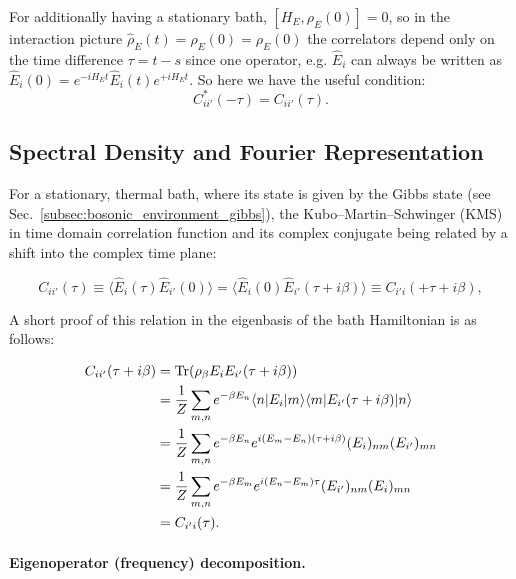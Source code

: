 \noindent
For additionally having a stationary bath, $[H_E, \rho_E(0)]=0$, so in the interaction picture $\hat{\rho}_E(t)=\hat{\rho}_E(0)=\rho_E(0)$ the correlators depend only on the time difference $\tau= t - s$ since one operator, e.g. $\hat{E}_{i}$ can always be written as $\hat{E}_{i}(0) = e^{-i H_E t} \hat{E}_i(t) e^{+i H_E t}$. So here we have the useful condition:
\begin{equation}
	C^{*}_{ii'}(-\tau) = C_{ii'}(\tau).
\end{equation}


\subsection{Spectral Density and Fourier Representation}
\label{subsec:spectral_density_representation}

\noindent
For a stationary, thermal bath, where its state is given by the Gibbs state (see Sec.~\ref{subsec:bosonic_environment_gibbs}), the Kubo--Martin--Schwinger (KMS) in time domain  correlation function and its complex conjugate being related by a shift into the complex time plane:

\begin{equation}
	C_{ii'}(\tau) \equiv \langle \hat{E}_{i}(\tau) \hat{E}_{i'}(0) \rangle  =  \langle \hat{E}_{i}(0) \hat{E}_{i'}(\tau + i \beta) \rangle  \equiv C_{i'i}(+\tau + i \beta),
	\label{eq:kms_time_relation}
\end{equation}

\noindent
A short proof of this relation in the eigenbasis of the bath Hamiltonian is as follows:

\begin{align}
	C_{ii'}(\tau + i \beta) &= \mathrm{Tr}(\rho_\beta E_i E_{i'}(\tau + i \beta)) \notag \\
	&= \frac{1}{Z} \sum_{m,n} e^{-\beta E_n} \langle n | E_i | m \rangle \langle m | E_{i'}(\tau + i \beta) | n \rangle \notag \\
	&= \frac{1}{Z} \sum_{m,n} e^{-\beta E_n} e^{i(E_m - E_n)(\tau + i \beta)} (E_i)_{nm} (E_{i'})_{mn} \notag \\
	&= \frac{1}{Z} \sum_{m,n} e^{-\beta E_m} e^{i(E_n - E_m)\tau} (E_{i'})_{nm} (E_i)_{mn} \notag \\
	&= C_{i'i}(\tau).
\end{align}



\paragraph{Eigenoperator (frequency) decomposition.}

